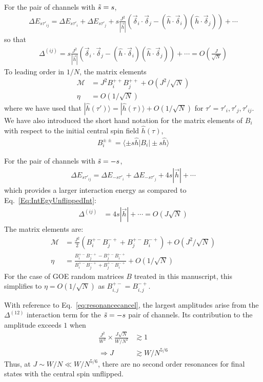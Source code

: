 \documentclass[aps,pra,twocolumn,a4paper,showpacs,superscriptaddress,floatfix,10pt]{revtex4}
\newcommand{\bra}[1]{\langle#1|}
\newcommand{\ket}[1]{|#1\rangle}
\begin{document}
\begin{widetext}
For the pair of channels with $\tilde{s} = s$,
\begin{align}
	\Delta E_{s \tau'_{ij}} = \Delta E_{s \tau'_i} + \Delta E_{s \tau'_j} + s \frac{J^2}{|\vec{h}|}( \vec{\delta}_i \cdot \vec{\delta}_j - (\hat{h}\cdot \vec{\delta}_i)(\hat{h}\cdot \vec{\delta}_j)) + \cdots
\end{align}
so that
\begin{align}
	\Delta^{(ij)} = s \frac{J^2}{|\vec{h}|}( \vec{\delta}_i \cdot \vec{\delta}_j - (\hat{h}\cdot \vec{\delta}_i)(\hat{h}\cdot \vec{\delta}_j)) + \cdots  = O\left(\frac{J}{\sqrt{N}}\right) \label{Eq:IntEgyUnflippedInt}
\end{align}
To leading order in $1/N$, the matrix elements
\begin{align}
	\mathcal{M} &= J^2 B_i^{++} B_j^{++} + O(J^2/\sqrt{N}) \\
	\eta &= O(1/\sqrt{N})
\end{align}
where we have used that $\ket{\hat{h}(\tau')} = \ket{\hat{h}(\tau)} + O(1/\sqrt{N})$ for $\tau' = \tau'_i, \tau'_j, \tau'_{ij}$. We have also introduced the short hand notation for the matrix elements of $B_i$ with respect to the initial central spin field $\hat{h}(\tau)$,
\begin{align}
	B_i^{\pm \pm} = \bra{\pm s \hat{h}} B_i \ket{\pm s \hat{h}}
\end{align}

For the pair of channels with $\tilde{s} = -s$,
\begin{align}
	\Delta E_{s \tau'_{ij}} = \Delta E_{-s \tau'_i} + \Delta E_{-s \tau'_j} + 4 s |\vec{h}| + \cdots
\end{align}
which provides a larger interaction energy as compared to Eq.~\eqref{Eq:IntEgyUnflippedInt}:
\begin{align}
	\Delta^{(ij)} &= 4 s |\vec{h}| + \cdots = O(J \sqrt{N})
\end{align}
The matrix elements are:
\begin{align}
	\mathcal{M} &= \frac{J^2}{2} \left(B_i^{+-} B_j^{-+} + B_j^{+-} B_i^{-+}\right)+ O(J^2/\sqrt{N}) \\
	\eta &= \frac{B_i^{+-} B_j^{-+} - B_j^{+-} B_i^{-+}}{B_i^{+-} B_j^{-+} + B_j^{+-} B_i^{-+}} + O(1/\sqrt{N})
\end{align}
For the case of GOE random matrices $B$ treated in this manuscript, this simplifies to $\eta = O(1/\sqrt{N})$ as $B_{i,j}^{+-} = B_{i,j}^{-+}$.

With reference to Eq.~\eqref{eq:resonancecancel}, the largest amplitudes arise from the $\Delta^{(12)}$ interaction term for the $\tilde{s} = -s$ pair of channels.
Its contribution to the amplitude exceeds $1$ when
\begin{align}
	\frac{J^2}{W^2}\times \frac{J \sqrt{N}}{W/N^2} &\gtrsim 1 \\
	\Rightarrow J &\gtrsim W/N^{5/6}
\end{align}
Thus, at $J \sim W/N \ll W/N^{5/6}$, there are no second order resonances for final states with the central spin unflipped.


\end{widetext}
\end{document}
